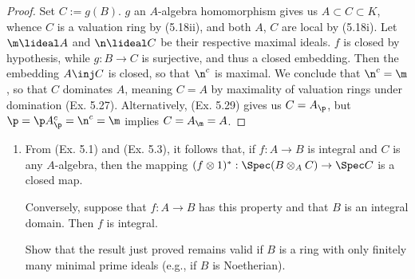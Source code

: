 \documentclass[12pt]{amsart}
\begin{document}
\begin{proof}
  Set $C:= g(B)$.
  $g$ an $A$-algebra homomorphism gives us $A\subset C\subset K$, whence $C$ is a valuation ring by (5.18ii), and both $A$, $C$ are local by (5.18i).
  Let $\m\lideal A$ and $\n\lideal C$ be their respective maximal ideals.
  $f$ is closed by hypothesis, while $g:B\to C$ is surjective, and thus a closed embedding.
  Then the embedding $A\inj C$ is closed, so that $\n^c$ is maximal.
  We conclude that $\n^c=\m$, so that $C$ dominates $A$, meaning $C=A$ by maximality of valuation rings under domination (Ex. 5.27).
  Alternatively, (Ex. 5.29) gives us $C=A_\p$, but $\p=\p A_\p^c=\n^c=\m$ implies $C=A_\m=A$.
\end{proof}

\begin{enumerate}
  \item[5.35] {
      From (Ex. 5.1) and (Ex. 5.3), it follows that, if $f:A\to B$ is integral and $C$ is any $A$-algebra, then the mapping $(f\otimes 1)^*:\Spec(B\otimes_A C)\to \Spec C$ is a closed map.

      Conversely, suppose that $f:A\to B$ has this property and that $B$ is an integral domain.
      Then $f$ is integral.

      Show that the result just proved remains valid if $B$ is a ring with only finitely many minimal prime ideals (e.g., if $B$ is Noetherian).
    }
\end{enumerate}
\end{document}
